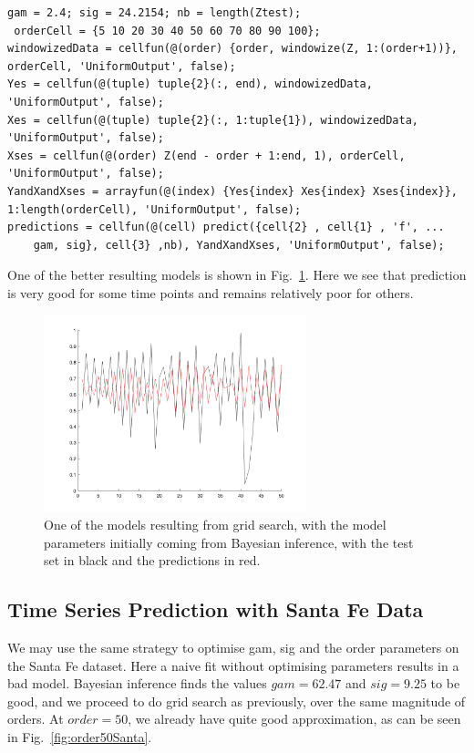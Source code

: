 \documentclass[10pt,a4paper]{article}
\begin{document}
 \begin{lstlisting}[style=Matlab-editor, frame=single]
 gam = 2.4; sig = 24.2154; nb = length(Ztest);
 orderCell = {5 10 20 30 40 50 60 70 80 90 100};
windowizedData = cellfun(@(order) {order, windowize(Z, 1:(order+1))}, orderCell, 'UniformOutput', false);
Yes = cellfun(@(tuple) tuple{2}(:, end), windowizedData, 'UniformOutput', false);
Xes = cellfun(@(tuple) tuple{2}(:, 1:tuple{1}), windowizedData, 'UniformOutput', false);
Xses = cellfun(@(order) Z(end - order + 1:end, 1), orderCell, 'UniformOutput', false);
YandXandXses = arrayfun(@(index) {Yes{index} Xes{index} Xses{index}}, 1:length(orderCell), 'UniformOutput', false);
predictions = cellfun(@(cell) predict({cell{2} , cell{1} , 'f', ...
    gam, sig}, cell{3} ,nb), YandXandXses, 'UniformOutput', false);
   \end{lstlisting}
  
One of the better resulting models is shown in Fig.~\ref{fig:model8Logmap}. Here we see that prediction is very good for some time points and remains relatively poor for others.
   
\begin{figure}[h!]
\centering
  \includegraphics[width=3in]{model8Logmap.png}
  \caption{One of the models resulting from grid search, with the model parameters initially coming from Bayesian inference, with the test set in black and the predictions in red.}
  \label{fig:model8Logmap}
\end{figure}

\subsection{Time Series Prediction with Santa Fe Data}

We may use the same strategy to optimise gam, sig and the order parameters on the Santa Fe dataset. Here a naive fit without optimising parameters results in a bad model. Bayesian inference finds the values $gam=62.47$ and $sig=9.25$ to be good, and we proceed to do grid search as previously, over the same magnitude of orders. At $order=50$, we already have quite good approximation, as can be seen in Fig.~\ref{fig:order50Santa}.
\end{document}
